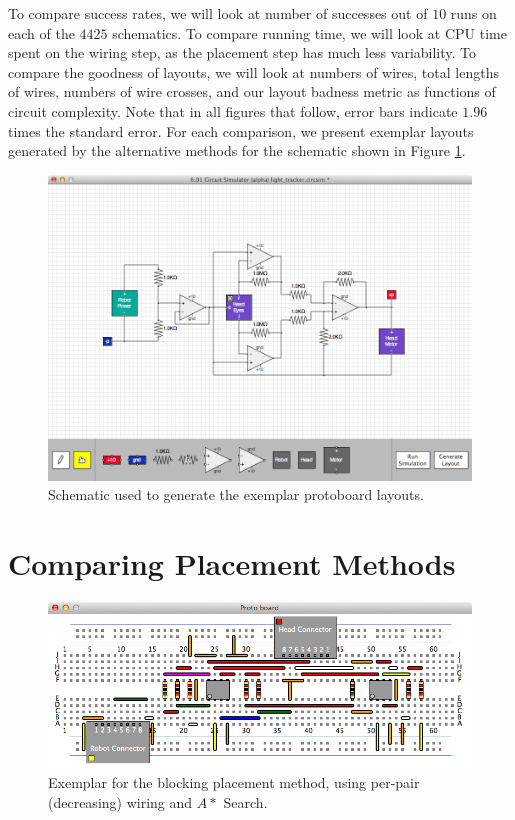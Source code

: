 To compare success rates, we will look at number of successes out of $10$ runs
on each of the $4425$ schematics. To compare running time, we will look at CPU
time spent on the wiring step, as the placement step has much less variability.
To compare the goodness of layouts, we will look at numbers of wires, total
lengths of wires, numbers of wire crosses, and our layout badness metric as
functions of circuit complexity. Note that in all figures that follow,
error bars indicate $1.96$ times the standard error. For each comparison,
we present exemplar layouts generated by the alternative methods for the
schematic shown in Figure \ref{fig:exemplar_schematic}.

\begin{figure}
\begin{center}
\includegraphics[width=\textwidth]{Images/exemplar_schematic.png}
\caption[Exemplar schematic]{Schematic used to generate the exemplar protoboard
layouts.}
\label{fig:exemplar_schematic}
\end{center}
\end{figure}

\section{Comparing Placement Methods}
\label{sec:compare_placement}

\begin{figure}[H]
\begin{center}
\includegraphics[width=\textwidth]{Images/exemplar_per_pair_decreasing.png}
\caption[Blocking method exemplar]{Exemplar for the blocking placement method,
using per-pair (decreasing) wiring and $A*$ Search.}
\end{center}
\end{figure}

